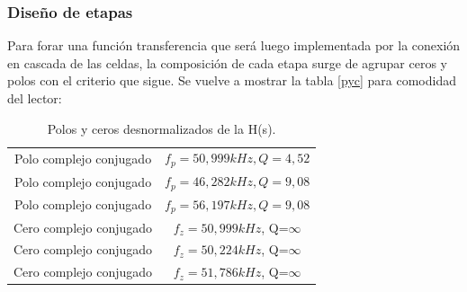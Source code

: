  \subsubsection{Dise\~no de etapas}

Para forar una funci\'on transferencia que ser\'a luego implementada por la conexi\'on en cascada de las celdas, la composici\'on de cada etapa surge de agrupar ceros y polos con el criterio que sigue. Se vuelve a mostrar la tabla \ref{pyc} para comodidad del lector:

	\begin{table}[H]
	\centering
	\begin{tabular}{c c}
		\hline
		Polo complejo conjugado& $f_p =50,999kHz, Q=4,52$ \\ 
		Polo complejo conjugado &  $f_p=46,282kHz, Q=9,08$\\
		Polo complejo conjugado & $f_p=56,197kHz, Q=9,08$\\
		Cero complejo conjugado & $f_z= 50,999kHz$, Q=$\infty$\\
		Cero complejo conjugado & $f_z= 50,224kHz$, Q=$\infty$\\
		Cero complejo conjugado & $f_z= 51,786kHz$, Q=$\infty$\\
		\hline
	\end{tabular}
	\caption{Polos y ceros desnormalizados de la H(s).}
	\label{pyc2}
\end{table}

